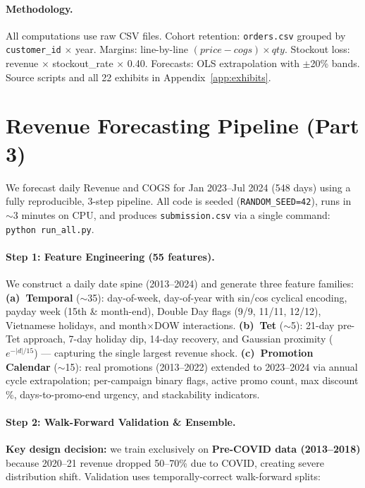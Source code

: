 \documentclass{article}
\begin{document}
\paragraph{Methodology.}
All computations use raw CSV files. Cohort retention: \texttt{orders.csv} grouped by \texttt{customer\_id} $\times$ year. Margins: line-by-line $(price - cogs) \times qty$. Stockout loss: revenue $\times$ stockout\_rate $\times$ 0.40. Forecasts: OLS extrapolation with $\pm$20\% bands. Source scripts and all 22 exhibits in Appendix~\ref{app:exhibits}.

\newpage
\section{Revenue Forecasting Pipeline (Part 3)}
\label{sec:forecasting}

We forecast daily Revenue and COGS for Jan 2023--Jul 2024 (548 days) using a fully reproducible, 3-step pipeline. All code is seeded (\texttt{RANDOM\_SEED=42}), runs in $\sim$3 minutes on CPU, and produces \texttt{submission.csv} via a single command: \texttt{python run\_all.py}.

\paragraph{Step 1: Feature Engineering (55 features).}
We construct a daily date spine (2013--2024) and generate three feature families:
\textbf{(a)~Temporal} ($\sim$35): day-of-week, day-of-year with sin/cos cyclical encoding, payday week (15th \& month-end), Double Day flags (9/9, 11/11, 12/12), Vietnamese holidays, and month$\times$DOW interactions.
\textbf{(b)~Tet} ($\sim$5): 21-day pre-Tet approach, 7-day holiday dip, 14-day recovery, and Gaussian proximity ($e^{-|d|/15}$) — capturing the single largest revenue shock.
\textbf{(c)~Promotion Calendar} ($\sim$15): real promotions (2013--2022) extended to 2023--2024 via annual cycle extrapolation; per-campaign binary flags, active promo count, max discount \%, days-to-promo-end urgency, and stackability indicators.

\paragraph{Step 2: Walk-Forward Validation \& Ensemble.}
\textbf{Key design decision:} we train exclusively on \textbf{Pre-COVID data (2013--2018)} because 2020--21 revenue dropped 50--70\% due to COVID, creating severe distribution shift. Validation uses temporally-correct walk-forward splits:
\end{document}
